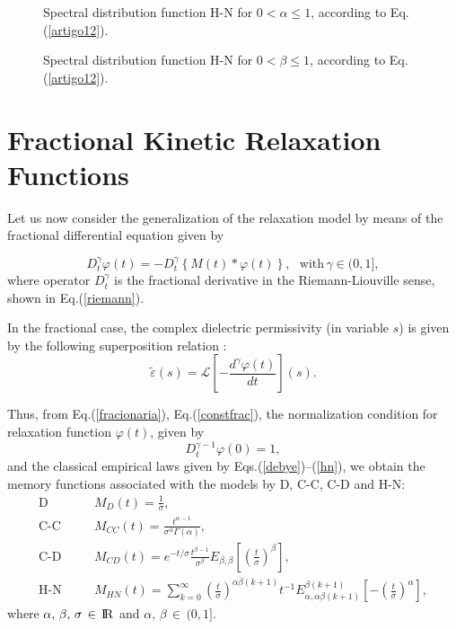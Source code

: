 \documentclass[12pt]{amsart}
\numberwithin{equation}{section}
\newcommand{\real}{{\rm I\!R}}
\begin{document}
\begin{figure}[H]
\center
{}
\qquad
{}
\caption{Spectral distribution function H-N for $0<\alpha\leq1$, according
	to Eq.(\ref{artigo12}).}
\label{artigo5}
\end{figure}
\begin{figure}[H]
\center
{}
\qquad
{}
\caption{Spectral distribution function H-N for $0<\beta\leq1$, according to Eq.(\ref{artigo12}).}
\label{artigo6}
\end{figure}

\section{Fractional Kinetic Relaxation Functions} 

Let us now consider the generalization of the relaxation model by means of the
fractional differential equation given by 

\begin{equation}
D_{t}^{\gamma}\varphi(t)=-D_{t}^{\gamma}\left\{M(t)\ast\varphi(t)\right\},
	\,\,\,\,\mbox{with}\,\gamma \in (0,1], 
\label{fracionaria}
\end{equation}
where operator $D_{t}^{\gamma}$ is the fractional derivative in the
Riemann-Liouville sense, shown in Eq.(\ref{riemann}). 

In the fractional case, the complex dielectric permissivity (in variable $s$)
is given by the following superposition relation \cite{Frohlich:1958}:
\begin{equation}
\tilde{\varepsilon}(s)=\mathscr{L}\left[-\frac{d^{\gamma}\varphi(t)}{dt}\right](s).
\label{constfrac}
\end{equation}

Thus, from Eq.(\ref{fracionaria}), Eq.(\ref{constfrac}), the normalization
condition for relaxation function $\varphi(t)$, given by
\begin{equation}
D^{\gamma-1}_{t}\varphi(0)=1,
\label{norma}
\end{equation}
and the classical empirical laws given by Eqs.(\ref{debye})--(\ref{hn}), 
we obtain the memory functions associated with the models by D, C-C, C-D and
H-N: 
 \begin{eqnarray}
\mbox{D}&\,\,\,\,\,\,&M_{D}(t)=\frac{1}{\sigma},\label{MT1}\\
\mbox{C-C}&\,\,\,\,\,\,&M_{CC}(t)=\frac{t^{\alpha-1}}{\sigma^{\alpha}\Gamma(\alpha)},\label{MT2}\\
\mbox{C-D}&\,\,\,\,\,\,&M_{CD}(t)=e^{-t/\sigma}\frac{t^{\beta-1}}{\sigma^{\beta}}E_{\beta,\beta}\left[\left(\frac{t}{\sigma}\right)^{\beta}\right],\label{MT3}\\
\mbox{H-N}&\,\,\,\,\,\,&M_{HN}(t)=\sum_{k=0}^{\infty}\left(\frac{t}{\sigma}\right)^{\alpha\beta(k+1)}t^{-1}E_{\alpha,\alpha\beta(k+1)}^{\beta(k+1)}\left[-\left(\frac{t}{\sigma}\right)^{\alpha}\right],\label{MT4}
\end{eqnarray}
where $\alpha,\,\beta,\,\sigma\,\in\,\real$ and $\alpha,\,\beta\,\in\,\mbox{(}0,1\mbox{]}$.
\end{document}
